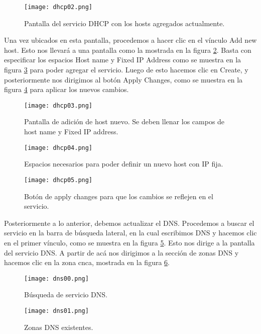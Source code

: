 \begin{figure}[H]
\centering
\texttt{[image: dhcp02.png]}
\caption{Pantalla del servicio DHCP con los hosts agregados actualmente.}
\label{fig:dhcp:02}
\end{figure}

Una vez ubicados en esta pantalla, procedemos a hacer clic en el vínculo Add new host. Esto nos llevará a una pantalla como la mostrada en la figura \ref{fig:dhcp:03}. Basta con especificar los espacios Host name y Fixed IP Address como se muestra en la figura \ref{fig:dhcp:04} para poder agregar el servicio. Luego de esto hacemos clic en Create, y posteriormente nos dirigimos al botón Apply Changes, como se muestra en la figura \ref{fig:dhcp:05} para aplicar los nuevos cambios.

\begin{figure}[H]
\centering
\texttt{[image: dhcp03.png]}
\caption{Pantalla de adición de host nuevo. Se deben llenar los campos de host name y Fixed IP address.}
\label{fig:dhcp:03}
\end{figure}

\begin{figure}[H]
\centering
\texttt{[image: dhcp04.png]}
\caption{Espacios necesarios para poder definir un nuevo host con IP fija.}
\label{fig:dhcp:04}
\end{figure}

\begin{figure}[H]
\centering
\texttt{[image: dhcp05.png]}
\caption{Botón de apply changes para que los cambios se reflejen en el servicio.}
\label{fig:dhcp:05}
\end{figure}

Posteriormente a lo anterior, debemos actualizar el DNS. Procedemos a buscar el servicio en la barra de búsqueda lateral, en la cual escribimos DNS y hacemos clic en el primer vínculo, como se muestra en la figura \ref{fig:dns:00}. Esto nos dirige a la pantalla del servicio DNS. A partir de acá nos dirigimos a la sección de zonas DNS y hacemos clic en la zona cnca, mostrada en la figura \ref{fig:dns:01}. 

\begin{figure}[H]
\centering
\texttt{[image: dns00.png]}
\caption{Búsqueda de servicio DNS.}
\label{fig:dns:00}
\end{figure}

\begin{figure}[H]
\centering
\texttt{[image: dns01.png]}
\caption{Zonas DNS existentes.}
\label{fig:dns:01}
\end{figure}

